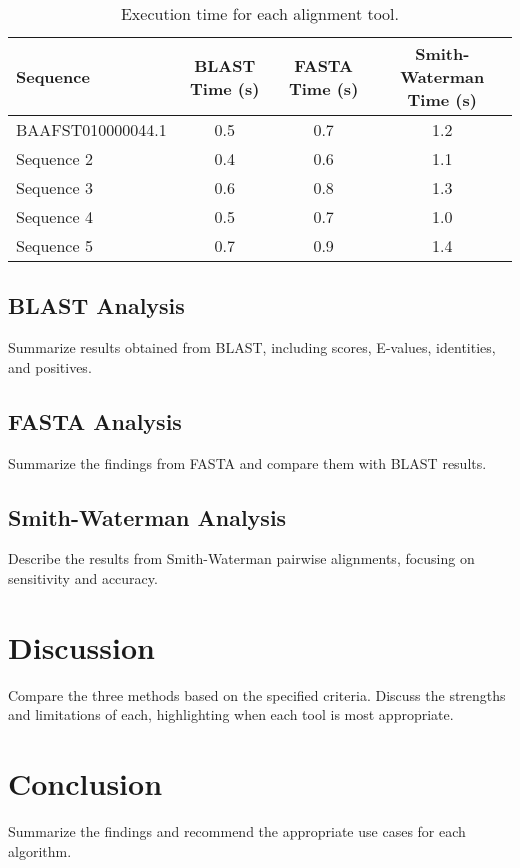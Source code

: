 \documentclass[a4paper,12pt]{article}
\begin{document}
\begin{table}[h!]
\centering
\begin{tabular}{|l|c|c|c|}
    \hline
    \textbf{Sequence} & \textbf{BLAST Time (s)} & \textbf{FASTA Time (s)} & \textbf{Smith-Waterman Time (s)} \\
    \hline
    BAAFST010000044.1 & 0.5 & 0.7 & 1.2 \\
    Sequence 2 & 0.4 & 0.6 & 1.1 \\
    Sequence 3 & 0.6 & 0.8 & 1.3 \\
    Sequence 4 & 0.5 & 0.7 & 1.0 \\
    Sequence 5 & 0.7 & 0.9 & 1.4 \\
    \hline
\end{tabular}
\caption{Execution time for each alignment tool.}
\label{table:time}
\end{table}

\subsection{BLAST Analysis}
Summarize results obtained from BLAST, including scores, E-values, identities, and positives.

\subsection{FASTA Analysis}
Summarize the findings from FASTA and compare them with BLAST results.

\subsection{Smith-Waterman Analysis}
Describe the results from Smith-Waterman pairwise alignments, focusing on sensitivity and accuracy.

\section{Discussion}
Compare the three methods based on the specified criteria. Discuss the strengths and limitations of each, highlighting when each tool is most appropriate.

\section{Conclusion}
Summarize the findings and recommend the appropriate use cases for each algorithm.
\end{document}
